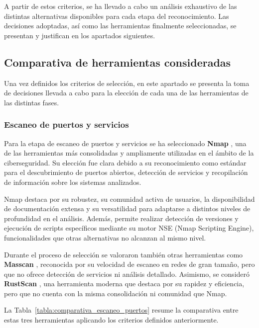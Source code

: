 \begin{parskipenv}
A partir de estos criterios, se ha llevado a cabo un análisis exhaustivo de las distintas alternativas disponibles para cada etapa del reconocimiento. Las decisiones adoptadas, así como las herramientas finalmente seleccionadas, se presentan y justifican en los apartados siguientes.

\subsection{Comparativa de herramientas consideradas}
Una vez definidos los criterios de selección, en este apartado se presenta la toma de decisiones llevada a cabo para la elección de cada una de las herramientas de las distintas fases.

\subsubsection*{Escaneo de puertos y servicios}
Para la etapa de escaneo de puertos y servicios se ha seleccionado \textbf{Nmap} \cite{nmap}, una de las herramientas más consolidadas y ampliamente utilizadas en el ámbito de la ciberseguridad. Su elección fue clara debido a su reconocimiento como estándar para el descubrimiento de puertos abiertos, detección de servicios y recopilación de información sobre los sistemas analizados.

Nmap destaca por su robustez, su comunidad activa de usuarios, la disponibilidad de documentación extensa y su versatilidad para adaptarse a distintos niveles de profundidad en el análisis. Además, permite realizar detección de versiones y ejecución de scripts específicos mediante su motor NSE (Nmap Scripting Engine), funcionalidades que otras alternativas no alcanzan al mismo nivel.

Durante el proceso de selección se valoraron también otras herramientas como \textbf{Masscan} \cite{masscan}, reconocida por su velocidad de escaneo en redes de gran tamaño, pero que no ofrece detección de servicios ni análisis detallado. Asimismo, se consideró \textbf{RustScan} \cite{rustscan}, una herramienta moderna que destaca por su rapidez y eficiencia, pero que no cuenta con la misma consolidación ni comunidad que Nmap.

La Tabla~\ref{tabla:comparativa_escaneo_puertos} resume la comparativa entre estas tres herramientas aplicando los criterios definidos anteriormente.


\end{parskipenv}

